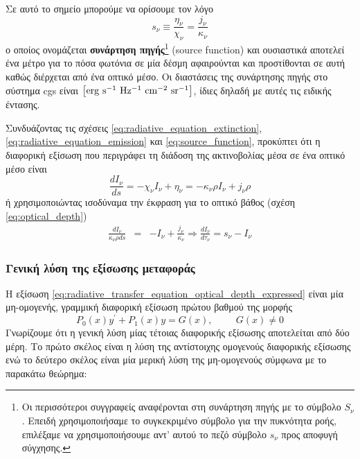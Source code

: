 Σε αυτό το σημείο μπορούμε να ορίσουμε τον λόγο 
\begin{equation}
    \label{eq:source_function}
    s_{\nu} \equiv \frac{\eta_{\nu}}{\chi_{\nu}} = \frac{j_{\nu}}{\kappa_{\nu}}
\end{equation}
ο οποίος ονομάζεται \textbf{συνάρτηση πηγής}\footnote{Οι περισσότεροι συγγραφείς αναφέρονται στη συνάρτηση πηγής με το σύμβολο $S_{\nu}$. Επειδή χρησιμοποιήσαμε το συγκεκριμένο σύμβολο για την πυκνότητα ροής, επιλέξαμε να χρησιμοποιήσουμε αντ' αυτού το πεζό σύμβολο $s_{\nu}$ προς αποφυγή σύγχησης.} (source function) και ουσιαστικά αποτελεί ένα μέτρο για το πόσα φωτόνια σε μία δέσμη αφαιρούνται και προστίθονται σε αυτή καθώς διέρχεται από ένα οπτικό μέσο. Οι διαστάσεις της συνάρτησης πηγής στο σύστημα cgs είναι $\rm \left[ erg \ s^{-1} \ Hz^{-1} \ cm^{-2} \ sr^{-1} \right]$, ίδιες δηλαδή με αυτές τις ειδικής έντασης.

Συνδυάζοντας τις σχέσεις \eqref{eq:radiative_equation_extinction}, \eqref{eq:radiative_equation_emission} και \eqref{eq:source_function}, προκύπτει ότι η διαφορική εξίσωση που περιγράφει τη διάδοση της ακτινοβολίας μέσα σε ένα οπτικό μέσο είναι
\begin{equation}
    \label{eq:radiative_transfer_equation}
    \frac{dI_{\nu}}{ds} = -\chi_{\nu} I_{\nu} + \eta_{\nu} =  - \kappa_{\nu} \rho I_{\nu} + j_{\nu} \rho
\end{equation}
ή χρησιμοποιώντας ισοδύναμα την έκφραση για το οπτικό βάθος (σχέση \eqref{eq:optical_depth})
\begin{eqnarray}
    \label{eq:radiative_transfer_equation_optical_depth_expressed}
    \frac{dI_{\nu}}{\kappa_{\nu} \rho ds} &=& - I_{\nu} + \frac{j_{\nu}}{\kappa_{\nu}} \Rightarrow  \boxed{\frac{dI_{\nu}}{d \tau_{\nu}} = s_{\nu} - I_{\nu}}
\end{eqnarray}



\subsubsection{Γενική λύση της εξίσωσης μεταφοράς}



Η εξίσωση \eqref{eq:radiative_transfer_equation_optical_depth_expressed} είναι μία μη-ομογενής, γραμμική διαφορική εξίσωση πρώτου βαθμού της μορφής $$P_0 (x) y^{\prime} + P_1 (x) y = G(x), \hspace{1cm} G(x) \neq 0$$
Γνωρίζουμε ότι η γενική λύση μίας τέτοιας διαφορικής εξίσωσης αποτελείται από δύο μέρη. Το πρώτο σκέλος είναι η λύση της αντίστοιχης ομογενούς διαφορικής εξίσωσης ενώ το δεύτερο σκέλος είναι μία μερική λύση της μη-ομογενούς σύμφωνα με το παρακάτω θεώρημα:\\

